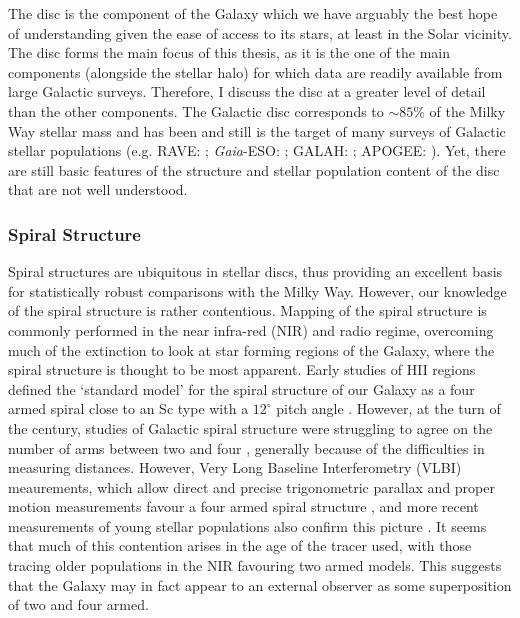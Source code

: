 The disc is the component of the Galaxy which we have arguably the best hope of understanding given the ease of access to its stars, at least in the Solar vicinity. The disc forms the main focus of this thesis, as it is the one of the main components (alongside the stellar halo) for which data are readily available from large Galactic surveys. Therefore, I discuss the disc at a greater level of detail than the other components. The Galactic disc corresponds to $\sim85\%$ of the Milky Way stellar mass \citep[e.g.][]{2013A&ARv..21...61R} and has been and still is the target of many surveys of Galactic stellar populations (e.g. RAVE: \citeauthor{2006AJ....132.1645S} \citeyear{2006AJ....132.1645S}; \emph{Gaia}-ESO: \citeauthor{2012Msngr.147...25G} \citeyear{2012Msngr.147...25G}; GALAH: \citeauthor{2016arXiv160902822M} \citeyear{2016arXiv160902822M}; APOGEE: \citeauthor{2015arXiv150905420M} \citeyear{2015arXiv150905420M}).  Yet, there are still basic features of the structure and stellar population content of the disc that are not well understood.

\subsubsection{Spiral Structure}
Spiral structures are ubiquitous in stellar discs, thus providing an excellent basis for statistically robust comparisons with the Milky Way. However, our knowledge of the spiral structure is rather contentious. Mapping of the spiral structure is commonly performed in the near infra-red (NIR) and radio regime, overcoming much of the extinction to look at star forming regions of the Galaxy, where the spiral structure is thought to be most apparent. Early studies of HII regions defined the `standard model' for the spiral structure of our Galaxy as a four armed spiral close to an Sc type with a $12^{\circ}$ pitch angle  \citep{1976A&A....49...57G}. However, at the turn of the century, studies of Galactic spiral structure were struggling to agree on the number of arms between two and four \citep[e.g.][]{1976A&A....46..261S,1980ApJ...239L..53C,1981ApJ...250..551B,1995ApJ...454..119V,2000A&A...358L..13D,2003A&A...397..133R}, generally because of the difficulties in measuring distances. However, Very Long Baseline Interferometry (VLBI) meaurements, which allow direct and precise trigonometric parallax and proper motion measurements favour a four armed spiral structure \citep{2009ApJ...700..137R,2014ApJ...783..130R}, and more recent measurements of young stellar populations also confirm this picture \citep{2014MNRAS.437.1791U,2015MNRAS.450.4150C}. It seems that much of this contention arises in the age of the tracer used, with those tracing older populations in the NIR \citep[e.g.][]{2000A&A...358L..13D} favouring two armed models. This suggests that the Galaxy may in fact appear to an external observer as some superposition of two and four armed. 

